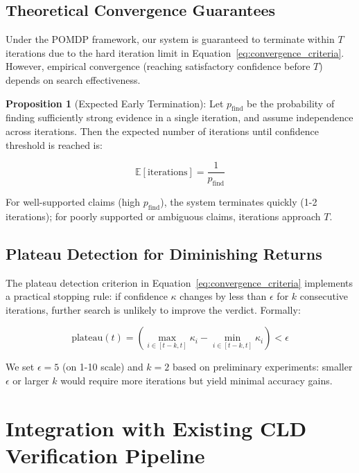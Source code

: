 \subsection{Theoretical Convergence Guarantees}

Under the POMDP framework, our system is guaranteed to terminate within $T$ iterations due to the hard iteration limit in Equation~\ref{eq:convergence_criteria}. However, empirical convergence (reaching satisfactory confidence before $T$) depends on search effectiveness.

\textbf{Proposition 1} (Expected Early Termination): Let $p_{\text{find}}$ be the probability of finding sufficiently strong evidence in a single iteration, and assume independence across iterations. Then the expected number of iterations until confidence threshold is reached is:

\begin{equation}
\mathbb{E}[\text{iterations}] = \frac{1}{p_{\text{find}}}
\label{eq:expected_iterations}
\end{equation}

For well-supported claims (high $p_{\text{find}}$), the system terminates quickly (1-2 iterations); for poorly supported or ambiguous claims, iterations approach $T$.

\subsection{Plateau Detection for Diminishing Returns}

The plateau detection criterion in Equation~\ref{eq:convergence_criteria} implements a practical stopping rule: if confidence $\kappa$ changes by less than $\epsilon$ for $k$ consecutive iterations, further search is unlikely to improve the verdict. Formally:

\begin{equation}
\text{plateau}(t) = \left( \max_{i \in [t-k, t]} \kappa_i - \min_{i \in [t-k, t]} \kappa_i \right) < \epsilon
\label{eq:plateau_detection}
\end{equation}

We set $\epsilon = 5$ (on 1-10 scale) and $k = 2$ based on preliminary experiments: smaller $\epsilon$ or larger $k$ would require more iterations but yield minimal accuracy gains.

\section{Integration with Existing CLD Verification Pipeline}

